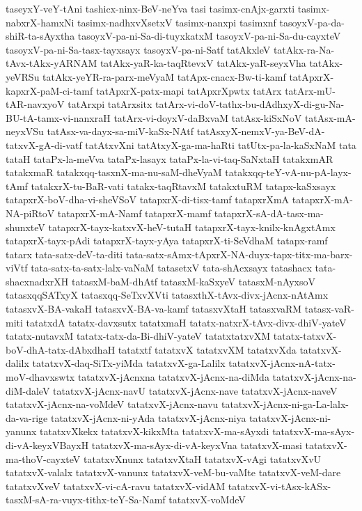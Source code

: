 {taseyxY-veY-tAni
tashicx-ninx-BeV-neYva
tasi
tasimx-cnAjx-garxti
tasimx-nabxrX-hamxNi
tasimx-nadhxvXsetxV
tasimx-nanxpi
tasimxnf
tasoyxV-pa-da-shiR-ta-sAyxtha
tasoyxV-pa-ni-Sa-di-tuyxkatxM
tasoyxV-pa-ni-Sa-du-cayxteV
tasoyxV-pa-ni-Sa-tasx-tayxsayx
tasoyxV-pa-ni-Satf
tatAkxleV
tatAkx-ra-Na-tAvx-tAkx-yARNAM
tatAkx-yaR-ka-taqRtevxV
tatAkx-yaR-seyxVha
tatAkx-yeVRSu
tatAkx-yeYR-ra-parx-meVyaM
tatApx-cnacx-Bw-ti-kamf
tatApxrX-kapxrX-paM-ci-tamf
tatApxrX-patx-mapi
tatApxrXpwtx
tatArx
tatArx-mU-tAR-navxyoV
tatArxpi
tatArxsitx
tatArx-vi-doV-tathx-bu-dAdhxyX-di-gu-Na-BU-tA-tamx-vi-nanxraH
tatArx-vi-doyxV-daBxvaM
tatAsx-kiSxNoV
tatAsx-mA-neyxVSu
tatAsx-va-dayx-sa-miV-kaSx-NAtf
tatAsxyX-nemxV-ya-BeV-dA-tatxvX-gA-di-vatf
tatAtxvXni
tatAtxyX-ga-ma-haRti
tatUtx-pa-la-kaSxNaM
tata
tataH
tataPx-la-meVva
tataPx-lasayx
tataPx-la-vi-taq-SaNxtaH
tatakxmAR
tatakxmaR
tatakxqq-tasxnX-ma-nu-saM-dheVyaM
tatakxqq-teY-vA-nu-pA-layx-tAmf
tatakxrX-tu-BaR-vati
tatakx-taqRtavxM
tatakxtuRM
tatapx-kaSxsayx
tatapxrX-boV-dha-vi-sheVSoV
tatapxrX-di-tisx-tamf
tatapxrXmA
tatapxrX-mA-NA-piRtoV
tatapxrX-mA-Namf
tatapxrX-mamf
tatapxrX-sA-dA-tasx-ma-shunxteV
tatapxrX-tayx-katxvX-heV-tutaH
tatapxrX-tayx-knilx-knAgxtAmx
tatapxrX-tayx-pAdi
tatapxrX-tayx-yAya
tatapxrX-ti-SeVdhaM
tatapx-ramf
tatarx
tata-satx-deV-ta-diti
tata-satx-sAmx-tApxrX-NA-duyx-tapx-titx-ma-barx-viVtf
tata-satx-ta-satx-lalx-vaNaM
tatasetxV
tata-shAcxsayx
tatashacx
tata-shacxnadxrXH
tatasxM-baM-dhAtf
tatasxM-kaSxyeV
tatasxM-nAyxsoV
tatasxqqSATxyX
tatasxqq-SeTxvXVti
tatasxthX-tAvx-divx-jAcnx-nAtAmx
tatasxvX-BA-vakaH
tatasxvX-BA-va-kamf
tatasxvXtaH
tatasxvaRM
tatasx-vaR-miti
tatatxdA
tatatx-davxsutx
tatatxmaH
tatatx-natxrX-tAvx-divx-dhiV-yateV
tatatx-nutavxM
tatatx-tatx-da-Bi-dhiV-yateV
tatatxtatxvXM
tatatx-tatxvX-boV-dhA-tatx-dAbxdhaH
tatatxtf
tatatxvX
tatatxvXM
tatatxvXda
tatatxvX-dalilx
tatatxvX-daq-SiTx-yiMda
tatatxvX-ga-Lalilx
tatatxvX-jAcnx-nA-tatx-moV-dhavxswtx
tatatxvX-jAcnxna
tatatxvX-jAcnx-na-diMda
tatatxvX-jAcnx-na-diM-daleV
tatatxvX-jAcnx-navU
tatatxvX-jAcnx-nave
tatatxvX-jAcnx-naveV
tatatxvX-jAcnx-na-voMdeV
tatatxvX-jAcnx-navu
tatatxvX-jAcnx-ni-ga-La-lalx-da-va-rige
tatatxvX-jAcnx-ni-yAda
tatatxvX-jAcnx-niya
tatatxvX-jAcnx-ni-yanunx
tatatxvXkekx
tatatxvX-kikxMta
tatatxvX-ma-sAyxdi
tatatxvX-ma-sAyx-di-vA-keyxVBayxH
tatatxvX-ma-sAyx-di-vA-keyxVna
tatatxvX-masi
tatatxvX-ma-thoV-cayxteV
tatatxvXnunx
tatatxvXtaH
tatatxvX-vAgi
tatatxvXvU
tatatxvX-valalx
tatatxvX-vanunx
tatatxvX-veM-bu-vaMte
tatatxvX-veM-dare
tatatxvXveV
tatatxvX-vi-cA-ravu
tatatxvX-vidAM
tatatxvX-vi-tAsx-kASx-tasxM-sA-ra-vuyx-tithx-teY-Sa-Namf
tatatxvX-voMdeV
}
